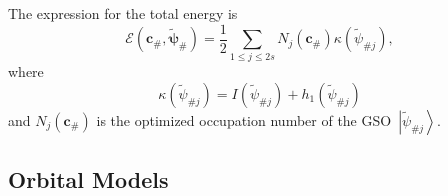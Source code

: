 \documentclass[aps,preprint]{revtex4}%
\begin{document}
The expression for the total energy is
\begin{equation}
\mathcal{E}\left(  \boldsymbol{c}_{\#},\boldsymbol{\tilde{\psi}}_{\#}\right)
=\frac{1}{2}\sum_{1\leq j\leq2s}N_{j}\left(  \boldsymbol{c}_{\#}\right)
\kappa\left(  \tilde{\psi}_{\#j}\right)  ,\label{OETenergy}%
\end{equation}
where
\begin{equation}
\kappa\left(  \tilde{\psi}_{\#j}\right)  =I\left(  \tilde{\psi}_{\#j}\right)
+h_{1}\left(  \tilde{\psi}_{\#j}\right)  \label{kappa}%
\end{equation}
and $N_{j}\left(  \boldsymbol{c}_{\#}\right)  $ is the optimized occupation
number of the GSO\ $\left\vert \tilde{\psi}_{\#j}\right\rangle .$

\subsection{Orbital Models\label{OrbModel}}
\end{document}
